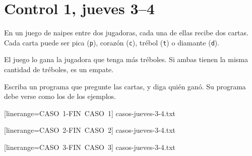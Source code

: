 \documentclass[12pt,spanish,a5paper,landscape]{article}
\begin{document}
  \newpage
  \part*{Control 1, jueves 3--4}
  \newpage

  En un juego de naipes entre dos jugadoras,
  cada una de ellas recibe dos cartas.
  Cada carta puede ser
  pica (\verb+p+),
  corazón (\verb+c+),
  trébol (\verb+t+) o
  diamante (\verb+d+).

  El juego lo gana la jugadora que tenga más tréboles.
  Si ambas tienen la misma cantidad de tréboles,
  es un empate.

  Escriba un programa que pregunte las cartas,
  y diga quién ganó.
  Su programa debe verse como los de los ejemplos.

  \begin{minipage}{0.25\textwidth}
      [linerange=CASO\ 1-FIN\ CASO\ 1]%
      {casos-jueves-3-4.txt}
  \end{minipage}
  \hspace{1em}
  \begin{minipage}{0.25\textwidth}
      [linerange=CASO\ 2-FIN\ CASO\ 2]%
      {casos-jueves-3-4.txt}
  \end{minipage}
  \hspace{1em}
  \begin{minipage}{0.25\textwidth}
      [linerange=CASO\ 3-FIN\ CASO\ 3]%
      {casos-jueves-3-4.txt}
  \end{minipage}
\end{document}
